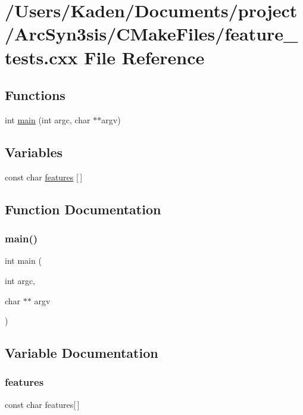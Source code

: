 \hypertarget{a00837}{}\section{/\+Users/\+Kaden/\+Documents/project/\+Arc\+Syn3sis/\+C\+Make\+Files/feature\+\_\+tests.cxx File Reference}
\label{a00837}
\subsection*{Functions}
\begin{DoxyCompactItemize}
\item 
int \hyperlink{a00837_a3c04138a5bfe5d72780bb7e82a18e627}{main} (int argc, char $\ast$$\ast$argv)
\end{DoxyCompactItemize}
\subsection*{Variables}
\begin{DoxyCompactItemize}
\item 
const char \hyperlink{a00837_a1582568e32f689337602a16bf8a5bff0}{features} \mbox{[}$\,$\mbox{]}
\end{DoxyCompactItemize}


\subsection{Function Documentation}
\mbox{\label{a00837_a3c04138a5bfe5d72780bb7e82a18e627}} 
\subsubsection{\texorpdfstring{main()}{main()}}
{\footnotesize\ttfamily int main (\begin{DoxyParamCaption}\item[{int}]{argc,  }\item[{char $\ast$$\ast$}]{argv }\end{DoxyParamCaption})}



\subsection{Variable Documentation}
\mbox{\label{a00837_a1582568e32f689337602a16bf8a5bff0}} 
\subsubsection{\texorpdfstring{features}{features}}
{\footnotesize\ttfamily const char features\mbox{[}$\,$\mbox{]}}

